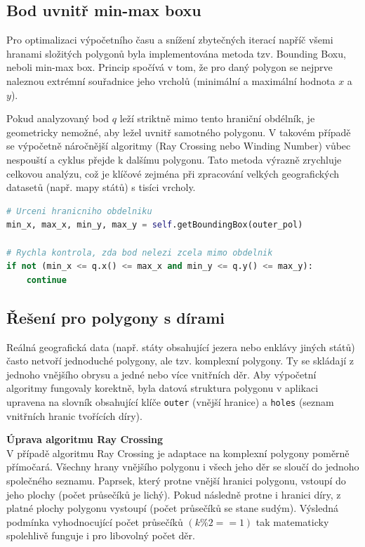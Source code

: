 \subsection{Bod uvnitř min-max boxu}
Pro optimalizaci výpočetního času a snížení zbytečných iterací napříč všemi hranami složitých polygonů byla implementována metoda tzv. Bounding Boxu, neboli min-max box. 
Princip spočívá v tom, že pro daný polygon se nejprve naleznou extrémní souřadnice jeho vrcholů (minimální a maximální hodnota $x$ a $y$). 

Pokud analyzovaný bod $q$ leží striktně mimo tento hraniční obdélník, je geometricky nemožné, aby ležel uvnitř samotného polygonu. V takovém případě se výpočetně náročnější algoritmy (Ray Crossing nebo Winding Number) vůbec nespouští a cyklus přejde k dalšímu polygonu. Tato metoda výrazně zrychluje celkovou analýzu, což je klíčové zejména při zpracování velkých geografických datasetů (např. mapy států) s tisíci vrcholy.

\begin{lstlisting}[language=Python, caption=Filtrování polygonů pomocí min-max boxu]
# Urceni hranicniho obdelniku
min_x, max_x, min_y, max_y = self.getBoundingBox(outer_pol)

# Rychla kontrola, zda bod nelezi zcela mimo obdelnik
if not (min_x <= q.x() <= max_x and min_y <= q.y() <= max_y):
    continue
\end{lstlisting}

\subsection{Řešení pro polygony s dírami}
Reálná geografická data (např. státy obsahující jezera nebo enklávy jiných států) často netvoří jednoduché polygony, ale tzv. komplexní polygony. Ty se skládají z jednoho vnějšího obrysu a jedné nebo více vnitřních děr. 
Aby výpočetní algoritmy fungovaly korektně, byla datová struktura polygonu v aplikaci upravena na slovník obsahující klíče \texttt{outer} (vnější hranice) a \texttt{holes} (seznam vnitřních hranic tvořících díry).

\vspace{0.5cm}
\textbf{Úprava algoritmu Ray Crossing}
\vspace{0.2cm}
\\
V případě algoritmu Ray Crossing je adaptace na komplexní polygony poměrně přímočará. Všechny hrany vnějšího polygonu i všech jeho děr se sloučí do jednoho společného seznamu. Paprsek, který protne vnější hranici polygonu, vstoupí do jeho plochy (počet průsečíků je lichý). Pokud následně protne i hranici díry, z platné plochy polygonu vystoupí (počet průsečíků se stane sudým). Výsledná podmínka vyhodnocující počet průsečíků $(k \% 2 == 1)$ tak matematicky spolehlivě funguje i pro libovolný počet děr.

